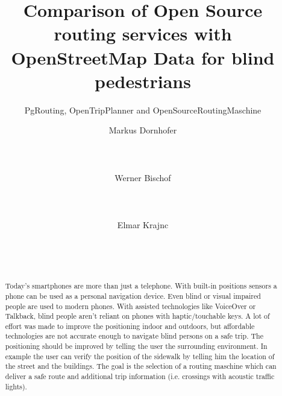 \documentclass{sig-alternate}
\begin{document}
%

\title{Comparison of Open Source routing services with OpenStreetMap Data for blind pedestrians}
\subtitle{PgRouting, OpenTripPlanner and OpenSourceRoutingMaschine}


\author{
\alignauthor Markus Dornhofer\\
       \\
       \\
       \\
\alignauthor Werner Bischof\\
       \\
       \\
       \\
\alignauthor Elmar Krajnc\\
       \\
       \\
       \\
}

\maketitle

\begin{abstract}
Today's smartphones are more than just a telephone. With built-in positions sensors a phone can be used as a personal navigation device. Even blind or visual impaired people are used to modern phones. With assisted technologies like VoiceOver or Talkback, blind people aren’t reliant on phones with haptic/touchable keys. A lot of effort was made to improve the positioning indoor and outdoors, but affordable technologies are not accurate enough to navigate blind persons on a safe trip. The positioning should be improved by telling the user the surrounding environment. In example the user can verify the position of the sidewalk by telling him the location of the street and the buildings. The goal is the selection of a routing maschine which can deliver a safe route and additional trip information (i.e. crossings with acoustic traffic lights). 
\end{abstract}
\end{document}
